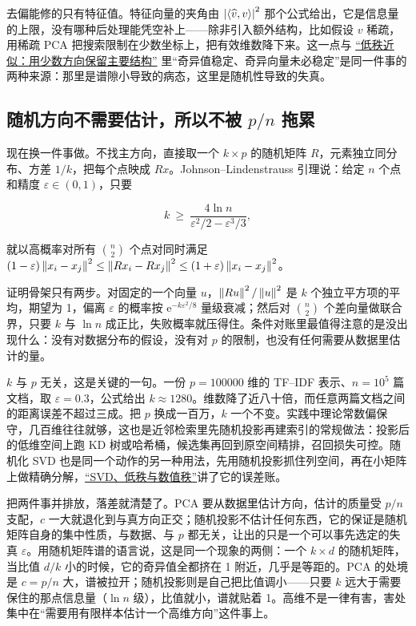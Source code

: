 去偏能修的只有特征值。特征向量的夹角由 \(\left|\left\langle\widehat v,v\right\rangle\right|^2\) 那个公式给出，它是信息量的上限，没有哪种后处理能凭空补上——除非引入额外结构，比如假设 \(v\) 稀疏，用稀疏 PCA 把搜索限制在少数坐标上，把有效维数降下来。这一点与 \hyperref[sec:03-Linear-Algebra/07-SVD-and-Data-Applications/03]{``低秩近似：用少数方向保留主要结构''} 里``奇异值稳定、奇异向量未必稳定''是同一件事的两种来源：那里是谱隙小导致的病态，这里是随机性导致的失真。

\subsection{随机方向不需要估计，所以不被 \(p/n\) 拖累}

现在换一件事做。不找主方向，直接取一个 \(k\times p\) 的随机矩阵 \(R\)，元素独立同分布、方差 \(1/k\)，把每个点映成 \(Rx\)。Johnson--Lindenstrauss 引理说：给定 \(n\) 个点和精度 \(\varepsilon\in(0,1)\)，只要

\[
k\ \ge\ \frac{4\ln n}{\varepsilon^2/2-\varepsilon^3/3},
\]

就以高概率对所有 \(\binom n2\) 个点对同时满足 \((1-\varepsilon)\left\lVert x_i-x_j\right\rVert^2\le\left\lVert Rx_i-Rx_j\right\rVert^2\le(1+\varepsilon)\left\lVert x_i-x_j\right\rVert^2\)。

证明骨架只有两步。对固定的一个向量 \(u\)，\(\left\lVert Ru\right\rVert^2/\left\lVert u\right\rVert^2\) 是 \(k\) 个独立平方项的平均，期望为 1，偏离 \(\varepsilon\) 的概率按 \(\mathrm e^{-k\varepsilon^2/8}\) 量级衰减；然后对 \(\binom n2\) 个差向量做联合界，只要 \(k\) 与 \(\ln n\) 成正比，失败概率就压得住。条件对账里最值得注意的是没出现什么：没有对数据分布的假设，没有对 \(p\) 的限制，也没有任何需要从数据里估计的量。

\(k\) 与 \(p\) 无关，这是关键的一句。一份 \(p=100000\) 维的 TF--IDF 表示、\(n=10^5\) 篇文档，取 \(\varepsilon=0.3\)，公式给出 \(k\approx1280\)。维数降了近八十倍，而任意两篇文档之间的距离误差不超过三成。把 \(p\) 换成一百万，\(k\) 一个不变。实践中理论常数偏保守，几百维往往就够，这也是近邻检索里先随机投影再建索引的常规做法：投影后的低维空间上跑 KD 树或哈希桶，候选集再回到原空间精排，召回损失可控。随机化 SVD 也是同一个动作的另一种用法，先用随机投影抓住列空间，再在小矩阵上做精确分解，\hyperref[sec:08-Numerical-Analysis/05-Numerical-Linear-Algebra/06]{``SVD、低秩与数值秩''}讲了它的误差账。

把两件事并排放，落差就清楚了。PCA 要从数据里估计方向，估计的质量受 \(p/n\) 支配，\(c\) 一大就退化到与真方向正交；随机投影不估计任何东西，它的保证是随机矩阵自身的集中性质，与数据、与 \(p\) 都无关，让出的只是一个可以事先选定的失真 \(\varepsilon\)。用随机矩阵谱的语言说，这是同一个现象的两侧：一个 \(k\times d\) 的随机矩阵，当比值 \(d/k\) 小的时候，它的奇异值全都挤在 1 附近，几乎是等距的。PCA 的处境是 \(c=p/n\) 大，谱被拉开；随机投影则是自己把比值调小——只要 \(k\) 远大于需要保住的那点信息量（\(\ln n\) 级），比值就小，谱就贴着 1。高维不是一律有害，害处集中在``需要用有限样本估计一个高维方向''这件事上。

